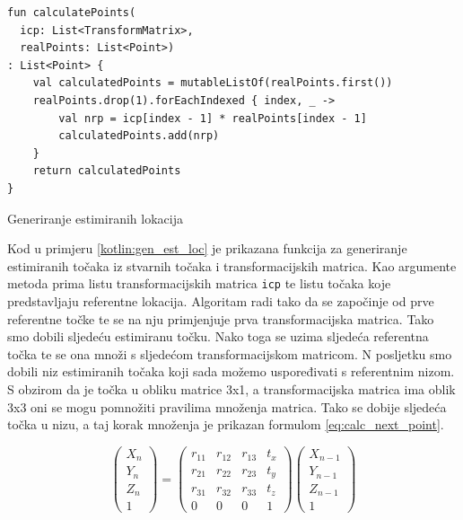 \begin{listing}[h!]
  \begin{verbatim}
fun calculatePoints(
  icp: List<TransformMatrix>,
  realPoints: List<Point>)
: List<Point> {
    val calculatedPoints = mutableListOf(realPoints.first())
    realPoints.drop(1).forEachIndexed { index, _ ->
        val nrp = icp[index - 1] * realPoints[index - 1]
        calculatedPoints.add(nrp)
    }
    return calculatedPoints
}
  \end{verbatim}
  \caption{Generiranje estimiranih lokacija}
  \label{kotlin:gen_est_loc}
\end{listing}

Kod u primjeru \ref{kotlin:gen_est_loc} je prikazana funkcija za generiranje estimiranih točaka iz stvarnih točaka i transformacijskih matrica. Kao argumente metoda prima listu transformacijskih matrica \texttt{icp} te listu točaka koje predstavljaju referentne lokacija. Algoritam radi tako da se započinje od prve referentne točke te se na nju primjenjuje prva transformacijska matrica. Tako smo dobili sljedeću estimiranu točku. Nako toga se uzima sljedeća referentna točka te se ona množi s sljedećom transformacijskom matricom. N posljetku smo dobili niz estimiranih točaka koji sada možemo uspoređivati s referentnim nizom. S obzirom da je točka u obliku matrice 3x1, a transformacijska matrica ima oblik 3x3 oni se mogu pomnožiti pravilima množenja matrica. Tako se dobije sljedeća točka u nizu, a taj korak množenja je prikazan formulom \ref{eq:calc_next_point}.

\begin{equation}
  \begin{pmatrix}
  X_{n}\\
  Y_{n}\\
  Z_{n}\\
  1
  \end{pmatrix}
  =
  \begin{pmatrix}
    r_{11} & r_{12} & r_{13} & t_{x}\\
    r_{21} & r_{22} & r_{23} & t_{y}\\
    r_{31} & r_{32} & r_{33} & t_{z}\\
    0      & 0      & 0      & 1
  \end{pmatrix}
  \begin{pmatrix}
    X_{n-1}\\
    Y_{n-1}\\
    Z_{n-1}\\
    1
  \end{pmatrix}
  \label{eq:calc_next_point}
\end{equation}

